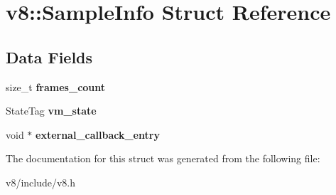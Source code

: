 \hypertarget{structv8_1_1SampleInfo}{}\section{v8\+:\+:Sample\+Info Struct Reference}
\label{structv8_1_1SampleInfo}
\subsection*{Data Fields}
\begin{DoxyCompactItemize}
\item 
\mbox{\label{structv8_1_1SampleInfo_a5f1e51bc358605e0c1d38fb2f3d344cd}} 
size\+\_\+t {\bfseries frames\+\_\+count}
\item 
\mbox{\label{structv8_1_1SampleInfo_afd6198c9feb44a8df79576cf427b9a91}} 
State\+Tag {\bfseries vm\+\_\+state}
\item 
\mbox{\label{structv8_1_1SampleInfo_ac18636e309f00c66a68a29d78eaf355a}} 
void $\ast$ {\bfseries external\+\_\+callback\+\_\+entry}
\end{DoxyCompactItemize}


The documentation for this struct was generated from the following file\+:\begin{DoxyCompactItemize}
\item 
v8/include/v8.\+h\end{DoxyCompactItemize}
